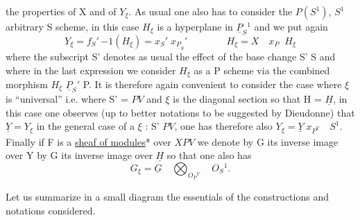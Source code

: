
the properties of X and of $Y_\xi$.  As usual one also has to consider
the $P(S^1)$, $S^1$ arbitrary S scheme, in this case $H_\xi$ is a hyperplane
in $\underline{P}_S{}^1$ and we put again
\[ Y_\xi = f_S{}'\,{-1}(H_\xi) = x_S{}'\; x_{\underline{P}_{S}}{}' \qquad\qquad H_\xi = X \quad x_P \;\; H_\xi \]
where the subscript S' denotes as usual the effect of the base
change S' \qquad\qquad S and where in the last expression we consider
$H_\xi$ as a P scheme via the combined morphism $H_\xi$ \qquad $\underline{P}_S{}'$ \quad P.  It is
therefore again convenient to consider the case where $\xi$ is
``universal'' i.e. where S' = $PV$ and $\xi$ is the diagonal section so
that H = $\underline{H}$, in this case one observes (up to better notations to
be suggested by Dieudonne) that $\underline{Y} = Y_\xi$ in the general case of a $\xi$
: S' \qquad\qquad $PV$, one has therefore also $Y_\xi = \underline{Y}\; x_{\underline{P}^{V}} \quad S^1$.  Finally if
F is a \uline{sheaf of modules}* over $XPV$ we denote by G its inverse image
over Y by G its inverse image over $\underline{H}$ so that one also has
\[ G_\xi = \underline{G} \quad \bigotimes_{O_{\underline{P}}{}^V} \quad O_S{}^1. \]

Let us summarize in a small diagram the essentials of the
constructions and notations considered.


